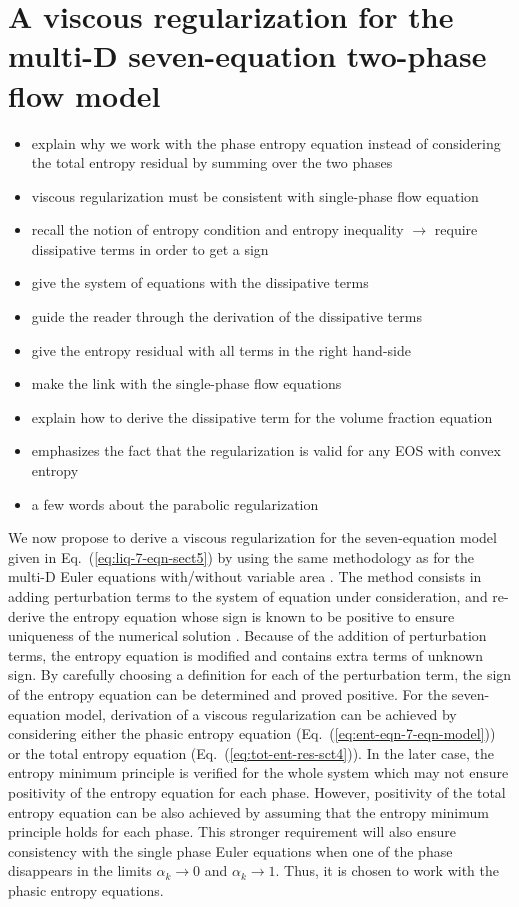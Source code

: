 \documentclass[preprint,10pt]{elsarticle}
\newcommand{\eqt}[1]{Eq.~(\ref{#1})}                     %
\begin{document}
\section{A viscous regularization for the multi-D seven-equation two-phase flow model}\label{sec:visc-regu}
\begin{itemize}
\item explain why we work with the phase entropy equation instead of considering the total entropy residual by summing over the two phases
\item viscous regularization must be consistent with single-phase flow equation
\item recall the notion of entropy condition and entropy inequality $\to$ require dissipative terms in order to get a sign
\item give the system of equations with the dissipative terms
\item guide the reader through the derivation of the dissipative terms
\item give the entropy residual with all terms in the right hand-side
\item make the link with the single-phase flow equations
\item explain how to derive the dissipative term for the volume fraction equation
\item emphasizes the fact that the regularization is valid for any EOS with convex entropy
\item a few words about the parabolic regularization
\end{itemize}
%
We now propose to derive a viscous regularization for the seven-equation model given in \eqt{eq:liq-7-eqn-sect5} by using the same methodology as for the multi-D Euler equations with/without variable area \cite{jlg, Marco_paper_low_mach}. The method consists in adding perturbation terms to the system of equation under consideration, and re-derive the entropy equation whose sign is known to be positive to ensure uniqueness of the numerical solution \cite{Leveque}. Because of the addition of perturbation terms, the entropy equation is modified and contains extra terms of unknown sign. By carefully choosing a definition for each of the perturbation term, the sign of the entropy equation can be determined and proved positive. For the seven-equation model, derivation of a viscous regularization can be achieved by considering either the phasic entropy equation (\eqt{eq:ent-eqn-7-eqn-model}) or the total entropy equation (\eqt{eq:tot-ent-res-sct4}). In the later case, the entropy minimum principle is verified for the whole system which may not ensure positivity of the entropy equation for each phase. However, positivity of the total entropy equation can be also achieved by assuming that the entropy minimum principle holds for each phase. This stronger requirement will also ensure consistency with the single phase Euler equations when one of the phase disappears in the limits $\alpha_k \to 0$ and $\alpha_k \to 1$. Thus, it is chosen to work with the phasic entropy equations.
\end{document}
